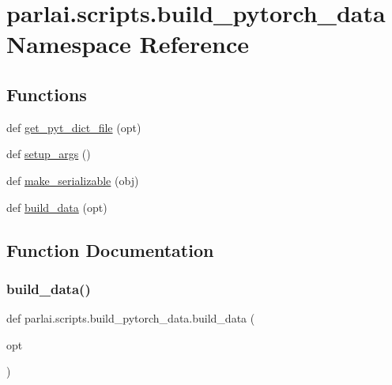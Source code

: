 \hypertarget{namespaceparlai_1_1scripts_1_1build__pytorch__data}{}\section{parlai.\+scripts.\+build\+\_\+pytorch\+\_\+data Namespace Reference}
\label{namespaceparlai_1_1scripts_1_1build__pytorch__data}
\subsection*{Functions}
\begin{DoxyCompactItemize}
\item 
def \hyperlink{namespaceparlai_1_1scripts_1_1build__pytorch__data_a6ec85a5842150af78f5178d75075b0cc}{get\+\_\+pyt\+\_\+dict\+\_\+file} (opt)
\item 
def \hyperlink{namespaceparlai_1_1scripts_1_1build__pytorch__data_afd88c85ffdbc233b56542e013352351a}{setup\+\_\+args} ()
\item 
def \hyperlink{namespaceparlai_1_1scripts_1_1build__pytorch__data_a1c8f4633b7dc8e990a3e1f6c3e92bd3f}{make\+\_\+serializable} (obj)
\item 
def \hyperlink{namespaceparlai_1_1scripts_1_1build__pytorch__data_a50d93b1dec37499085b9eafc6e425a1a}{build\+\_\+data} (opt)
\end{DoxyCompactItemize}


\subsection{Function Documentation}
\mbox{\label{namespaceparlai_1_1scripts_1_1build__pytorch__data_a50d93b1dec37499085b9eafc6e425a1a}} 
\subsubsection{\texorpdfstring{build\+\_\+data()}{build\_data()}}
{\footnotesize\ttfamily def parlai.\+scripts.\+build\+\_\+pytorch\+\_\+data.\+build\+\_\+data (\begin{DoxyParamCaption}\item[{}]{opt }\end{DoxyParamCaption})}

